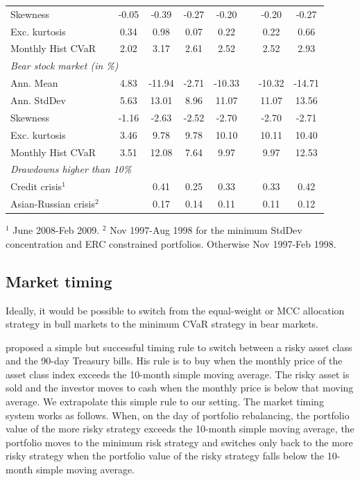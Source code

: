 \documentclass[12pt,a4paper]{article}
\begin{document}
\begin{table}[tb]
\begin{center}
{\begin{tabular}{|lc c  cccc c cc| }
  \multicolumn{2}{|l}{Skewness }       &      &  -0.05 & -0.39 & -0.27 & -0.20 && -0.20 & -0.27   \\
    \multicolumn{2}{|l}{Exc. kurtosis }   &     & 0.34 & 0.98 & 0.07 & 0.22 & &0.22 & 0.66 \\
 \multicolumn{2}{|l}{Monthly Hist  CVaR}   &    &  2.02 & 3.17 & 2.61 & 2.52 & & 2.52 & 2.93 \\ \hline
 \multicolumn{10}{|l|}{\emph{Bear stock market (in \%)}} \\
 \multicolumn{2}{|l}{Ann. Mean  }    &       & 4.83 & -11.94 & -2.71 & -10.33 & & -10.32 & -14.71 \\
 \multicolumn{2}{|l}{Ann. StdDev}     &       & 5.63 & 13.01 & 8.96 & 11.07 & & 11.07 & 13.56       \\
  \multicolumn{2}{|l}{Skewness}     &         & -1.16 & -2.63 & -2.52 & -2.70 & & -2.70 & -2.71 \\
    \multicolumn{2}{|l}{Exc. kurtosis}   &     &3.46 & 9.78 & 9.78 & 10.10 & & 10.11 & 10.40     \\
 \multicolumn{2}{|l}{Monthly Hist  CVaR}   &	 & 3.51 & 12.08 & 7.64 & 9.97 & & 9.97 & 12.53 \\ \hline
\multicolumn{10}{|l|}{ \emph{Drawdowns higher than 10\%}  }  \\
 \multicolumn{2}{|l}{Credit crisis$^{1}$}       &   &   & 0.41 & 0.25 & 0.33 & &  0.33 & 0.42  \\
 \multicolumn{2}{|l}{Asian-Russian crisis$^{2}$}&  &   & 0.17 & 0.14 &0.11 & &  0.11 & 0.12 \\  \hline
\end{tabular}
}
\end{center}

{\scriptsize $^{1}$  June 2008-Feb 2009.  $^{2}$  Nov 1997-Aug 1998 for the minimum StdDev concentration and ERC constrained portfolios. Otherwise Nov 1997-Feb 1998.  }
\end{table}

\clearpage

\subsection{Market timing}\label{subsec:tactical}

Ideally, it would be possible to switch from the equal-weight or MCC allocation strategy in bull markets to the minimum CVaR strategy in bear markets.

\citet{Faber2007}  proposed a simple but successful timing rule to switch between a risky asset class and the 90-day Treasury bills. His rule is to buy when the monthly price of the asset class index exceeds the 10-month simple moving average. The risky asset is sold and the investor moves to cash when the monthly price is below that moving average. We extrapolate this simple rule to our setting. The market timing system works as follows. When, on the day of portfolio rebalancing, the  portfolio value of the more risky strategy exceeds the 10-month simple moving average, the portfolio moves to the minimum risk strategy and switches only back to the more risky strategy when the portfolio value of the risky strategy falls below the 10-month simple moving average.
\end{document}
